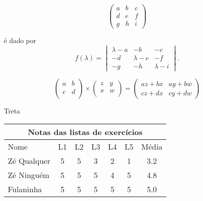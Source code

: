 \documentclass[11pt]{article}
\begin{document}
\[
    \begin{pmatrix}
        a & b & c \\
        d & e & f \\
        g & h & i
    \end{pmatrix}
\]

é dado por
\begin{equation*}
    f(\lambda) =
    \begin{vmatrix}
        \lambda - a & -b & -c \\
        -d & \lambda - e & -f \\
        -g & -h & \lambda - i
    \end{vmatrix}.
\end{equation*}


\begin{equation*}
    \begin{pmatrix}
        a & b \\
        c & d \\
    \end{pmatrix}
    \times
    \begin{pmatrix}
        z & y \\
        x & w \\
    \end{pmatrix}
    =
    \begin{pmatrix}
        az + bx & ay + bw \\
        cz + dx & cy + dw
    \end{pmatrix}
\end{equation*}


Treta


\begin{tabular}[t]{|l|ccccc|c|}
    \multicolumn{7}{c}{Notas das listas de exercícios} \\
    \hline
    Nome & L1 & L2 & L3 & L4 & L5 & Média \\
    \hline
    Zé Qualquer & 5 & 5 & 3 & 2 & 1 & 3.2 \\
    Zé Ninguém  & 5 & 5 & 5 & 4 & 5 & 4.8 \\
    Fulaninha   & 5 & 5 & 5 & 5 & 5 & 5.0\\
    \hline
\end{tabular}
\end{document}
